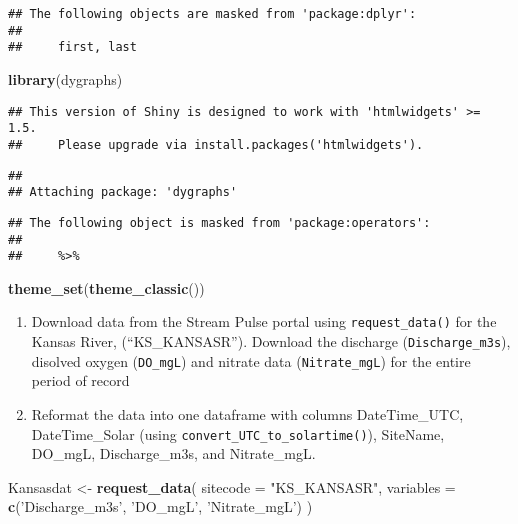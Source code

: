 \documentclass[]{article}
\newenvironment{Shaded}{\begin{snugshade}}{\end{snugshade}}
\newcommand{\DataTypeTok}[1]{\textcolor[rgb]{0.13,0.29,0.53}{#1}}
\newcommand{\KeywordTok}[1]{\textcolor[rgb]{0.13,0.29,0.53}{\textbf{#1}}}
\newcommand{\NormalTok}[1]{#1}
\newcommand{\StringTok}[1]{\textcolor[rgb]{0.31,0.60,0.02}{#1}}
\begin{document}
\begin{verbatim}
## The following objects are masked from 'package:dplyr':
## 
##     first, last
\end{verbatim}

\begin{Shaded}
\begin{Highlighting}[]
\KeywordTok{library}\NormalTok{(dygraphs)}
\end{Highlighting}
\end{Shaded}

\begin{verbatim}
## This version of Shiny is designed to work with 'htmlwidgets' >= 1.5.
##     Please upgrade via install.packages('htmlwidgets').
\end{verbatim}

\begin{verbatim}
## 
## Attaching package: 'dygraphs'
\end{verbatim}

\begin{verbatim}
## The following object is masked from 'package:operators':
## 
##     %>%
\end{verbatim}

\begin{Shaded}
\begin{Highlighting}[]
\KeywordTok{theme_set}\NormalTok{(}\KeywordTok{theme_classic}\NormalTok{())}
\end{Highlighting}
\end{Shaded}

\begin{enumerate}
\def\labelenumi{\arabic{enumi}.}
\setcounter{enumi}{3}
\item
  Download data from the Stream Pulse portal using
  \texttt{request\_data()} for the Kansas River, (``KS\_KANSASR'').
  Download the discharge (\texttt{Discharge\_m3s}), disolved oxygen
  (\texttt{DO\_mgL}) and nitrate data (\texttt{Nitrate\_mgL}) for the
  entire period of record
\item
  Reformat the data into one dataframe with columns DateTime\_UTC,
  DateTime\_Solar (using \texttt{convert\_UTC\_to\_solartime()}),
  SiteName, DO\_mgL, Discharge\_m3s, and Nitrate\_mgL.
\end{enumerate}

\begin{Shaded}
\begin{Highlighting}[]
\NormalTok{Kansasdat <-}\StringTok{ }\KeywordTok{request_data}\NormalTok{(}
  \DataTypeTok{sitecode =} \StringTok{"KS_KANSASR"}\NormalTok{,}
  \DataTypeTok{variables =} \KeywordTok{c}\NormalTok{(}\StringTok{'Discharge_m3s'}\NormalTok{, }\StringTok{'DO_mgL'}\NormalTok{, }\StringTok{'Nitrate_mgL'}\NormalTok{)}
\NormalTok{  )}
\end{Highlighting}
\end{Shaded}
\end{document}
